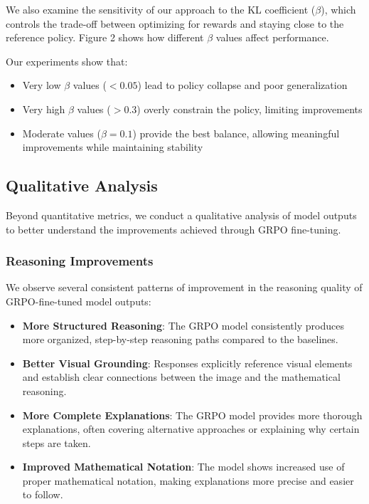 \documentclass[11pt,a4paper]{article}
\begin{document}
We also examine the sensitivity of our approach to the KL coefficient ($\beta$), which controls the trade-off between optimizing for rewards and staying close to the reference policy. Figure 2 shows how different $\beta$ values affect performance.


Our experiments show that:
\begin{itemize}
    \item Very low $\beta$ values ($<0.05$) lead to policy collapse and poor generalization
    \item Very high $\beta$ values ($>0.3$) overly constrain the policy, limiting improvements
    \item Moderate values ($\beta = 0.1$) provide the best balance, allowing meaningful improvements while maintaining stability
\end{itemize}

\subsection{Qualitative Analysis}

Beyond quantitative metrics, we conduct a qualitative analysis of model outputs to better understand the improvements achieved through GRPO fine-tuning.

\subsubsection{Reasoning Improvements}

We observe several consistent patterns of improvement in the reasoning quality of GRPO-fine-tuned model outputs:

\begin{itemize}
    \item \textbf{More Structured Reasoning}: The GRPO model consistently produces more organized, step-by-step reasoning paths compared to the baselines.
    \item \textbf{Better Visual Grounding}: Responses explicitly reference visual elements and establish clear connections between the image and the mathematical reasoning.
    \item \textbf{More Complete Explanations}: The GRPO model provides more thorough explanations, often covering alternative approaches or explaining why certain steps are taken.
    \item \textbf{Improved Mathematical Notation}: The model shows increased use of proper mathematical notation, making explanations more precise and easier to follow.
\end{itemize}
\end{document}
